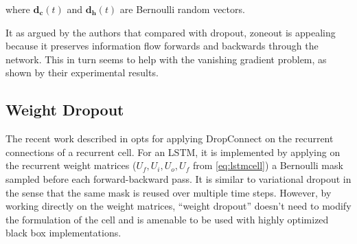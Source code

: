 where $\mathbf{d_c}(t)$ and $\mathbf{d_h}(t)$ are Bernoulli random vectors.

It as argued by the authors that compared with dropout, zoneout is appealing because it preserves information flow forwards and backwards through the network. This in turn seems to help with the vanishing gradient problem, as shown by their experimental results.

\subsection{Weight Dropout}

The recent work described in \cite{merity2017regularizing} opts for applying DropConnect \cite{wan2013regularization} on the recurrent connections of a recurrent cell. For an LSTM, it is implemented by applying on the recurrent weight matrices ($U_f,U_i,U_o,U_f$ from \autoref{eq:lstmcell}) a Bernoulli mask  sampled before each forward-backward pass. It is similar to variational dropout in the sense that the same mask is reused over multiple time steps. However, by working directly on the weight matrices, ``weight dropout'' doesn't need to modify the formulation of the cell and is amenable to be used with highly optimized black box implementations.